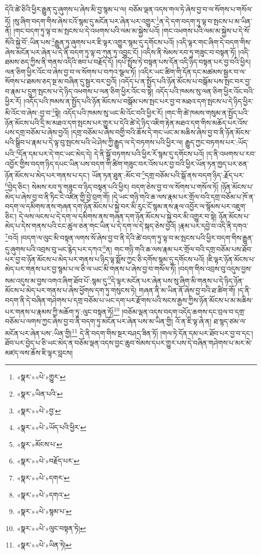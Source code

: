 དེའི་ཚེ་ཅིའི་ཕྱིར་རྒྱུན་དུ་ཞུགས་པ་ཞེས་མི་བྱ་སྙམ་པ་ལ། བཅོམ་ལྡན་འདས་གལ་ཏེ་ཞེས་བྱ་བ་ལ་སོགས་པ་གསོལ་ཏོ། །སུ་ཞིག་བདག་གིས་ཞེས་ངའོ་སྙམ་དུ་མངོན་པར་ཞེན་པར་འགྱུར་\footnote{«སྣར་»«པེ་»གྱུར་}ན་དེ་དག་བདག་ཏུ་ལྟ་བ་སྤངས་པ་མ་ཡིན་ནོ། །གང་བདག་ཏུ་ལྟ་བ་མ་སྤངས་པ་དེ་འཕགས་པའི་ལམ་མ་སྐྱེས་པའོ། །གང་འཕགས་པའི་ལམ་མ་སྐྱེས་པ་དེ་སོ་སོའི་སྐྱེ་བོ་:ཡིན་པས་\footnote{«སྣར་»ཡིན་པའི་}རྒྱུན་ཏུ་ཞུགས་པར་ཇི་ལྟར་འགྱུར་སྙམ་དུ་དགོངས་པའོ། །འདི་ལྟར་གང་ཞིག་དེ་བདག་གིས་ཞེས་མངོན་པར་ཞེན་པ་དེ་ནི་བདག་ཏུ་ལྟ་བ་ཀུན་ཏུ་འབྱུང་ངོ། །འདིས་ནི་སེམས་རབ་ཏུ་གཟུང་བ་བསྟན་ཏོ། །འདི་ཐམས་ཅད་ཀྱིས་ནི་གནས་འདིའི་ཟབ་པ་བརྗོད་དོ། །དཔེ་སྤྲོས་ཏེ་བསྟན་པས་དོན་འདི་ཉིད་བསྟན་པར་བྱ་བའི་ཕྱིར། ལན་ཅིག་ཕྱིར་འོང་བ་ཞེས་བྱ་བ་ལ་སོགས་པ་བཀའ་སྩལ་ཏོ། །འདིར་ཡང་ཚིག་གི་དོན་དང་མཚམས་སྦྱར་བ་ལ་སོགས་པ་ཐམས་ཅད་སྔ་མ་བཞིན་དུ་སྦྱར་བར་བྱའོ། །འདོད་པ་ན་སྤྱོད་པའི་ཉོན་མོངས་པ་བསྒོམ་པས་སྤང་བར་བྱ་བ་རྣམ་པ་དྲུག་སྤངས་པ་དེ་ཉིད་འཕགས་པ་ལན་ཅིག་ཕྱིར་འོང་བ་སྟེ། འདོད་པའི་ཁམས་སུ་ལན་ཅིག་ཕྱིར་འོང་བའི་ཕྱིར་རོ། །འདོད་པའི་ཁམས་ན་སྤྱོད་པའི་ཉོན་མོངས་པ་བསྒོམ་པས་སྤང་པར་བྱ་བ་མཐའ་དག་སྤངས་པ་དེ་ཉིད་ཕྱིར་མི་འོང་བ་ཞེས་:བྱ་བ་\footnote{«སྣར་»«པེ་»བྱ་}སྟེ། འདོད་པའི་ཁམས་སུ་ཡང་མི་འོང་བའི་ཕྱིར་རོ། །གང་གི་ཚེ་ཁམས་གསུམ་ན་སྤྱོད་པའི་ཉོན་མོངས་པའི་དྲི་མ་མཐའ་དག་སྤངས་པར་གྱུར་པ་དེའི་ཚེ་དེ་ཉིད་འཇིག་རྟེན་མཐའ་དག་གིས་མཆོད་པར་འོས་པས་དགྲ་བཅོམ་པ་ཞེས་བྱའོ། །དགྲ་བཅོམ་པ་ཞེས་བགྱི་བའི་ཆོས་དེ་གང་ཡང་མ་མཆིས་ཞེས་བྱ་བ་ནི་ཉོན་མོངས་པའི་སྒྲིབ་པ་རྣམ་པ་དེ་ལྟ་བུ་སྤངས་པའི་ཡེ་ཤེས་ཀྱི་རྒྱུད་ལ་དེ་བཏགས་པའི་ཕྱིར་ལ། རྒྱུད་ཀྱང་བཏགས་པར་:ཡོད་པའི་\footnote{«སྣར་»«པེ་»ཡོད་པའི་ཕྱིར་}དོན་དམ་པར་དེ་གང་ཡང་མེད་དེ། དེ་ནི་སྒྲོ་བཏགས་པའི་ཕྱིར་རོ་སྙམ་དུ་དགོངས་པའོ། །ད་ནི་འཕགས་པ་རབ་འབྱོར་གྱིས་བདག་ཉིད་དཔང་ཡིན་པས་བདག་གི་ཚིག་གཟུང་བར་འོས་པར་བྱ་བའི་ཕྱིར་ཡོན་ཏན་ཁྱད་པར་ཅན་ཉོན་མོངས་པ་མེད་པར་གནས་པ་དང་། ཡོན་ཏན་ཐུན་:མོང་བ་\footnote{«སྣར་»མོངས་པ་}དགྲ་བཅོམ་པའི་སྒོ་ནས་བདག་ཉིད་:རྗོད་པར་\footnote{«སྣར་»«པེ་»བརྗོད་པར་}བྱེད་ཅིང་། སེམས་རབ་ཏུ་གཟུང་བ་ཉིད་བསྟན་པའི་ཕྱིར། བདག་ཅེས་བྱ་བ་ལ་སོགས་པ་གསོལ་ཏོ། །ཉོན་མོངས་པ་མེད་པ་ཞེས་བྱ་བ་ནི་ཏིང་ངེ་འཛིན་གྱི་བྱེ་བྲག་གོ། །དེ་ཡང་གཉི་གའི་ཆ་ལས་རྣམ་པར་གྲོལ་བའི་དགྲ་བཅོམ་པ་ཁོ་ན་བདག་ལ་དམིགས་ནས་གཞན་དག་ཉོན་མོངས་པ་སྐྱེ་བར་མི་རུང་ངོ་སྙམ་ནས་རྣལ་འབྱོར་ལ་སྙོམས་པར་འཇུག་ཅིང་། དེ་ལས་ལངས་པ་དེ་དག་ལ་དམིགས་ནས་གཞན་དག་ཉོན་མོངས་པ་སྐྱེ་བར་མི་འགྱུར་བ་སྟེ། ཉོན་མོངས་པ་མེད་པ་དེས་གནས་པའི་ངང་ཚུལ་ཅན་གང་ཡིན་པ་དེ་དག་ལ་དེ་སྐད་ཅེས་བྱའོ། །རྣམ་པར་དབྱེ་བ་འདི་ནི་དགའ་\footnote{«སྣར་»«པེ་»དགར་}བའོ། །བདག་ལ་ལུང་མི་བསྟན་ལགས་སོ་ཞེས་བྱ་བ་ནི་དེའི་ཚེ་བདག་ཏུ་ལྟ་བ་མ་སྤངས་པའི་ཕྱིར་བདག་གིས་རྒྱུན་དུ་ཞུགས་པའི་འབྲས་བུ་ཡང་རྙེད་པར་དཀའ་\footnote{«སྣར་»«པེ་»དགའ་}ན། གང་གཉི་གའི་ཆ་ལས་རྣམ་པར་གྲོལ་བའི་དགྲ་བཅོམ་པས་ཐོབ་པར་བྱ་བ་ཉོན་མོངས་པ་མེད་པར་གནས་པ་ཉིད་ལྟ་སྨོས་ཀྱང་ཅི་དགོས་སྙམ་དུ་དགོངས་པའོ། །ཇི་ལྟར་ཉོན་མོངས་པ་མེད་པར་གནས་པར་བྱ་སྙམ་པ་ལ་ཅི་ལ་ཡང་མི་གནས་པ་ཞེས་བྱ་བ་གསོལ་ཏོ། །བདག་གིས་འབྲས་བུ་འདུས་བྱས་སམ་འདུས་མ་བྱས་འགའ་ཞིག་ཐོབ་པོ་:སྙམ་དུ་\footnote{«སྣར་»«པེ་»སྙམ་པ་}དེ་ལྟར་མངོན་པར་ཞེན་པས་སུ་ཞིག་མི་གནས་པ་དེ་ཉིད་ཉོན་མོངས་པ་མེད་པར་གནས་པ་ཞེས་ཕྱོགས་དག་ཏུ་གསུངས་ཏེ། གཞན་ནི་མ་ཡིན་ནོ་ཞེས་བྱ་བའི་ཐ་ཚིག་གོ། །ད་ནི་བདག་ནི་དེ་བཞིན་གཤེགས་པ་དགྲ་བཅོམ་པ་ཡང་དག་པར་རྫོགས་པའི་སངས་རྒྱས་ཀྱིས་ཉོན་མོངས་པ་མ་མཆིས་པར་གནས་པ་རྣམས་ཀྱི་མཆོག་ཏུ་:ལུང་བསྟན་ཏོ།\footnote{«སྣར་»«པེ་»ལུང་བསྟན་ཏེ།} །བཅོམ་ལྡན་འདས་བདག་འདོད་ཆགས་དང་བྲལ་བ་དགྲ་བཅོམ་པ་ལགས་ཀྱང་ཞེས་བྱ་བ་ནི་བདག་ཏུ་མངོན་པར་ཞེན་པས་མ་ཡིན་གྱི། འོ་ན་ཇི་ལྟ་ཞེ་ན། ཐ་སྙད་ཙམ་ལ་མངོན་པར་ཞེན་པས་:ཡིན་གྱི།\footnote{«སྣར་»«པེ་»ཡིན་ཏེ།} དེ་ནི་བདག་གིས་སྔར་བཤད་ཟིན་ཏོ། །གལ་ཏེ་དོན་དམ་པར་ཐོབ་པར་བྱ་བ་དང་། ཐོབ་པར་བྱེད་པ་ཅི་ཡང་མེད་ན་བཅོམ་ལྡན་འདས་བྱང་ཆུབ་སེམས་དཔར་གྱུར་པས་དེ་བཞིན་གཤེགས་པ་མར་མེ་མཛད་ལས་ཆོས་ཇི་ལྟར་བླངས། 